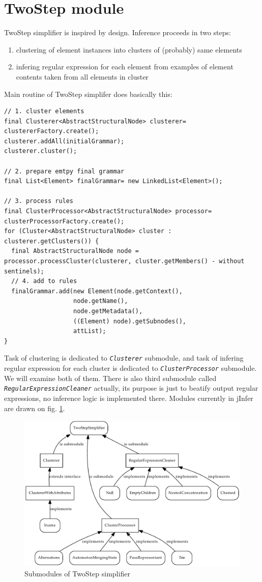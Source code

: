 \documentclass[a4paper,10pt,oneside]{article}
\newcommand{\myscale}{0.74}
\newcommand{\jmodule}[1]{\texttt{\textsl{#1}}}
\begin{document}
\section{TwoStep module}
TwoStep simplifier is inspired by \cite{1802522} design. Inference proceeds in two steps:
\begin{enumerate}
	\item clustering of element instances into clusters of (probably) same elements
	\item infering regular expression for each element from examples of element contents taken from all elements in cluster
\end{enumerate}
Main routine of TwoStep simplifer does basically this:
\begin{verbatim}
// 1. cluster elements
final Clusterer<AbstractStructuralNode> clusterer= clustererFactory.create();
clusterer.addAll(initialGrammar);
clusterer.cluster();

// 2. prepare emtpy final grammar
final List<Element> finalGrammar= new LinkedList<Element>();

// 3. process rules
final ClusterProcessor<AbstractStructuralNode> processor= clusterProcessorFactory.create();
for (Cluster<AbstractStructuralNode> cluster : clusterer.getClusters()) {
  final AbstractStructuralNode node =  processor.processCluster(clusterer, cluster.getMembers() - without sentinels);
  // 4. add to rules
  finalGrammar.add(new Element(node.getContext(),
                   node.getName(),
                   node.getMetadata(),
                   ((Element) node).getSubnodes(),
                   attList);
}
\end{verbatim}
Task of clustering is dedicated to \jmodule{Clusterer} submodule, and task of infering regular expression for each cluster is dedicated to \jmodule{ClusterProcessor} submodule. We will examine both of them.
There is also third submodule called \jmodule{RegularExpressionCleaner} actually, its purpose is just to beatify output regular expressions, no inference logic is implemented there. 
Modules currently in jInfer are drawn on fig. \ref{twostep_modules}.
\begin{figure}
	\centering\includegraphics[scale=\myscale]{twostep_modules}
	\caption{Submodules of TwoStep simplifier} \label{twostep_modules}
\end{figure}
\end{document}
